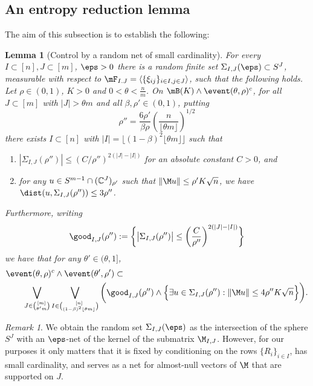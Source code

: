 \documentclass[aop,preprint]{imsart}
\theoremstyle{plain}
\newtheorem{lemma}[theorem]{Lemma}
\theoremstyle{definition}
\theoremstyle{remark}
\newtheorem{remark}[theorem]{Remark}
\numberwithin{equation}{section}
\numberwithin{theorem}{section}
\def \lf {\lfloor}
\def \rf {\rfloor}
\begin{document}
\subsection{An entropy reduction lemma}		\label{sec:entropy}

The aim of this subsection is to establish the following:

\begin{lemma}[Control by a random net of small cardinality]	\label{lem:entropy}
For every $I\subset[n], J\subset [m]$, $\eps>0$ there is a random finite set $\Sigma_{I,J}(\eps)\subset S^J$, measurable with respect to $\mF_{I.J} =\langle \{\xi_{ij}\}_{i\in I,j\in J}\rangle$, such that the following holds.
Let $\rho\in (0,1)$, $K>0$ and $0<\theta< \frac nm$.
On $\mB(K)\wedge \event(\theta,\rho)^c$, for all $J\subset [m]$ with $|J|>\theta m$ and all $\beta,\rho'\in (0,1)$, 
putting
\begin{equation}	\label{def:rhodub}
\rho''=\frac{6\rho'}{\beta \rho}\left(\frac{n}{\lf \theta m\rf}\right)^{1/2}
\end{equation}
there exists $I\subset[n]$ with $|I|=\lf (1-\beta)^2\lf \theta m\rf\rf$ such that 
\begin{enumerate}[(1)]
\item $|\Sigma_{I,J}(\rho'')| \le (C/\rho'')^{2(|J|-|I|)}$ for an absolute constant $C>0$, and
\item for any $u\in S^{m-1}\cap ({\mathbb C}^J)_{\rho'}$ such that $\|\M u\|\le \rho'K\sqrt{n}$, we have $\dist(u,\Sigma_{I,J}(\rho'')) \le 3\rho''$.
\end{enumerate}
Furthermore, writing
\begin{equation}
\good_{I,J}(\rho'') := \bigg\{ \big| \Sigma_{I,J}(\rho'')\big|\le \bigg(\frac{C}{\rho''}\bigg)^{2(|J|-|I|)} \bigg\}
\end{equation}
we have that for any $\theta'\in (\theta,1]$,
\begin{align}
&\event(\theta,\rho)^c \wedge \event(\theta',\rho') \subset \notag\\
&\quad\quad
\bigvee_{J\in {[m]\choose  \theta' m}} \bigvee_{I\in {[n]\choose  (1-\beta)^2\lf \theta m\rf}} \bigg(  \good_{I,J}(\rho'')
\wedge\Big\{ \exists u \in \Sigma_{I,J}(\rho''): \|\M u\|\le 4\rho''K\sqrt{n} \Big\}\bigg).\label{cont:entropy}
\end{align}
\end{lemma}

\begin{remark}
We obtain the random set $\Sigma_{I,J}(\eps)$ as the intersection of the sphere $S^J$ with an $\eps$-net of the kernel of the submatrix $\M_{I, J}$. 
However, for our purposes it only matters that it is fixed by conditioning on the rows $\{R_i\}_{i\in I}$, has small cardinality, and serves as a net for almost-null vectors of $\M$ that are supported on $J$.
\end{remark}
\end{document}

